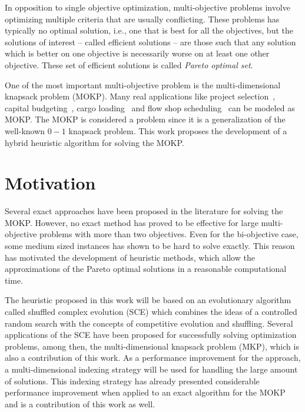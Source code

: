In opposition to single objective optimization,
multi-objective problems
involve optimizing multiple criteria that are usually conflicting.
These problems has typically no optimal solution, i.e.,
one that is best for all the objectives, but the solutions of interest
-- called efficient solutions -- are those such
that any solution which is better on one
objective is necessarily worse on at least one other objective.
These set of efficient solutions is called \emph{Pareto optimal set}.

One of the most important multi-objective problem is the
multi-dimensional knapsack problem (MOKP).
Many real applications like
project selection~\cite{teng1996multiobjective},
capital budgeting~\cite{rosenblatt1989generating},
cargo loading~\cite{teng1996multiobjective}
and flow shop scheduling~\cite{ishibuchi2015behavior}
can be modeled as MOKP.
The MOKP is considered a \nphard{} problem since it is a generalization
of the well-known $0-1$ knapsack problem.
This work proposes the development of a hybrid heuristic algorithm
for solving the MOKP.

\section{Motivation}

Several exact approaches have been proposed in the literature for
solving the MOKP.
However, no exact method has proved to be effective
for large multi-objective problems with more than two objectives.
Even for the bi-objective case, some medium sized instances
has shown to be hard to solve exactly.
This reason has motivated the development of heuristic methods,
which allow the approximations of the
Pareto optimal solutions in a reasonable computational time.


The heuristic proposed in this work will be based on an
evolutionary algorithm called shuffled complex evolution (SCE)
which combines the ideas of a controlled random search with the concepts
of competitive evolution and shuffling.
Several applications of the SCE have been proposed for successfully
solving optimization problems, among then,
the multi-dimensional knapsack problem (MKP), which is
also a contribution of this work.
As a performance improvement for the approach,
a multi-dimensional indexing strategy
will be used for handling the large amount of solutions.
This indexing strategy  has already presented
considerable performance improvement
when applied to an exact algorithm for the MOKP~\cite{baroni2017}
and is a contribution of this work as well.

